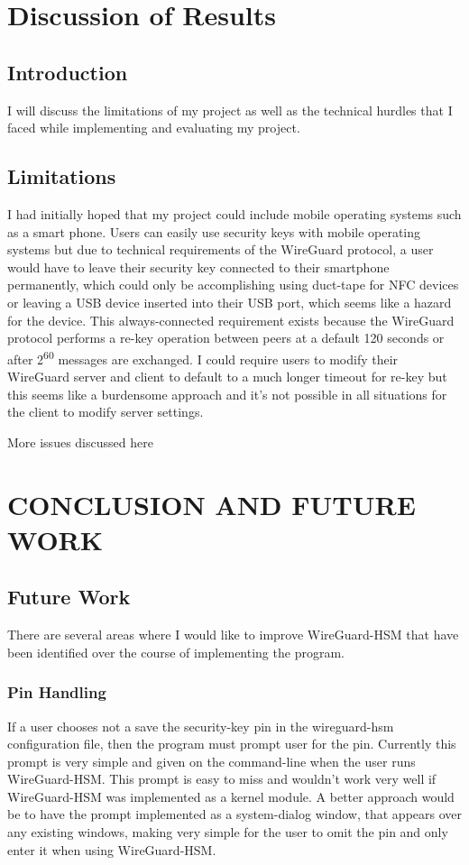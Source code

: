 \documentclass [11pt, proquest] {uwthesis}[2020/02/24]
\begin{document}
\chapter {Discussion of Results}
\section {Introduction}
I will discuss the limitations of my project as well as the technical hurdles that I faced while implementing and evaluating my project.

\section {Limitations}
I had initially hoped that my project could include mobile operating systems such as a smart phone. Users can easily use security keys
with mobile operating systems but due to technical requirements of the WireGuard protocol, a user would have to leave their security key connected
to their smartphone permanently, which could only be accomplishing using duct-tape for NFC devices or leaving a USB device inserted into their USB port, which 
seems like a hazard for the device. This always-connected requirement exists because the WireGuard protocol performs a re-key operation between peers at a default 120 seconds 
or after 2\textsuperscript{60} messages are exchanged. I could require users to modify their WireGuard server and client to default to a much longer 
timeout for re-key but this seems like a burdensome approach and it's not possible in all situations for the client to modify server settings.

More issues discussed here 


\chapter {CONCLUSION AND FUTURE WORK}



\section {Future Work}
There are several areas where I would like to improve WireGuard-HSM that have been identified over the course of implementing the program.

\subsection{Pin Handling}
 If a user chooses not a save the security-key pin in the wireguard-hsm configuration file, then the program must prompt user for the pin. Currently this prompt is very simple and given on the command-line when the user runs WireGuard-HSM. This prompt is easy to miss and wouldn't work very well if WireGuard-HSM was implemented as a kernel module. A better approach would be to have the prompt implemented as a system-dialog window, that appears over any existing windows, making very simple for the user to omit the pin and only enter it when using WireGuard-HSM.



\end{document}

